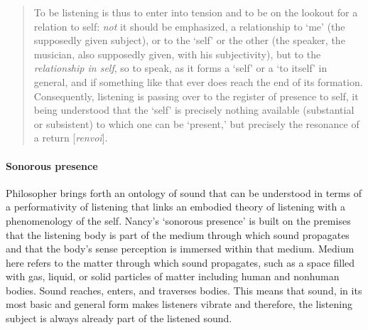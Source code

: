 \begin{quote}
	To be listening is thus to enter into tension and to be on the lookout for a relation to self: \textit{not} it should be emphasized, a relationship to `me' (the supposedly given subject), or to the `self' or the other (the speaker, the musician, also supposedly given, with his subjectivity), but to the \textit{relationship in self}, so to speak, as it forms a `self' or a `to itself' in general, and if something like that ever does reach the end of its formation. Consequently, listening is passing over to the register of presence to self, it being understood that the `self' is precisely nothing available (substantial or subsistent) to which one can be `present,' but precisely the resonance of a return [\textit{renvoi}]. \parencite[12]{Nan07:Lis}
\end{quote} %

\paragraph{Sonorous presence}
Philosopher \textcite{Nan07:Lis} brings forth an ontology of sound that can be understood in terms of a performativity of listening that links an embodied theory of listening with a phenomenology of the self. Nancy's `sonorous presence’ is built on the premises that the listening body is part of the medium through which sound propagates and that the body's sense perception is immersed within that medium. Medium here refers to the matter through which sound propagates, such as a space filled with gas, liquid, or solid particles of matter including human and nonhuman bodies. Sound reaches, enters, and traverses bodies. This means that sound, in its most basic and general form makes listeners vibrate and therefore, the listening subject is always already part of the listened sound.

